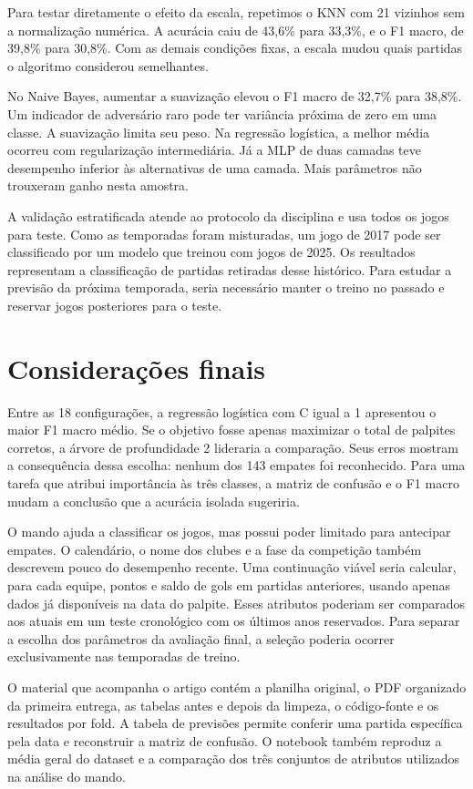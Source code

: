 \documentclass[12pt]{article}
\begin{document}
Para testar diretamente o efeito da escala, repetimos o KNN com 21 vizinhos sem a normalização numérica. A acurácia caiu de 43,6\% para 33,3\%, e o F1 macro, de 39,8\% para 30,8\%. Com as demais condições fixas, a escala mudou quais partidas o algoritmo considerou semelhantes.

No Naive Bayes, aumentar a suavização elevou o F1 macro de 32,7\% para 38,8\%. Um indicador de adversário raro pode ter variância próxima de zero em uma classe. A suavização limita seu peso. Na regressão logística, a melhor média ocorreu com regularização intermediária. Já a MLP de duas camadas teve desempenho inferior às alternativas de uma camada. Mais parâmetros não trouxeram ganho nesta amostra. 

A validação estratificada atende ao protocolo da disciplina e usa todos os jogos para teste. Como as temporadas foram misturadas, um jogo de 2017 pode ser classificado por um modelo que treinou com jogos de 2025. Os resultados representam a classificação de partidas retiradas desse histórico. Para estudar a previsão da próxima temporada, seria necessário manter o treino no passado e reservar jogos posteriores para o teste.
\clearpage
\section{Considerações finais}
Entre as 18 configurações, a regressão logística com C igual a 1 apresentou o maior F1 macro médio. Se o objetivo fosse apenas maximizar o total de palpites corretos, a árvore de profundidade 2 lideraria a comparação. Seus erros mostram a consequência dessa escolha: nenhum dos 143 empates foi reconhecido. Para uma tarefa que atribui importância às três classes, a matriz de confusão e o F1 macro mudam a conclusão que a acurácia isolada sugeriria.

O mando ajuda a classificar os jogos, mas possui poder limitado para antecipar empates. O calendário, o nome dos clubes e a fase da competição também descrevem pouco do desempenho recente. Uma continuação viável seria calcular, para cada equipe, pontos e saldo de gols em partidas anteriores, usando apenas dados já disponíveis na data do palpite. Esses atributos poderiam ser comparados aos atuais em um teste cronológico com os últimos anos reservados. Para separar a escolha dos parâmetros da avaliação final, a seleção poderia ocorrer exclusivamente nas temporadas de treino.

O material que acompanha o artigo contém a planilha original, o PDF organizado da primeira entrega, as tabelas antes e depois da limpeza, o código-fonte e os resultados por fold. A tabela de previsões permite conferir uma partida específica pela data e reconstruir a matriz de confusão. O notebook também reproduz a média geral do dataset e a comparação dos três conjuntos de atributos utilizados na análise do mando.
\end{document}
